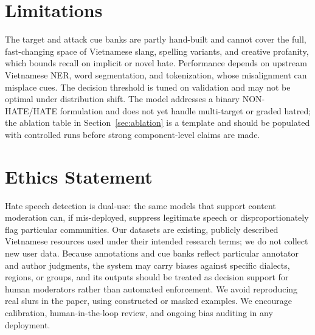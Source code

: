\documentclass[11pt]{article}
\begin{document}
\section*{Limitations}
The target and attack cue banks are partly hand-built and cannot cover the full, fast-changing space of Vietnamese slang, spelling variants, and creative profanity, which bounds recall on implicit or novel hate. Performance depends on upstream Vietnamese NER, word segmentation, and tokenization, whose misalignment can misplace cues. The decision threshold is tuned on validation and may not be optimal under distribution shift. The model addresses a binary NON-HATE/HATE formulation and does not yet handle multi-target or graded hatred; the ablation table in Section~\ref{sec:ablation} is a template and should be populated with controlled runs before strong component-level claims are made.

\section*{Ethics Statement}
Hate speech detection is dual-use: the same models that support content moderation can, if mis-deployed, suppress legitimate speech or disproportionately flag particular communities. Our datasets are existing, publicly described Vietnamese resources used under their intended research terms; we do not collect new user data. Because annotations and cue banks reflect particular annotator and author judgments, the system may carry biases against specific dialects, regions, or groups, and its outputs should be treated as decision support for human moderators rather than automated enforcement. We avoid reproducing real slurs in the paper, using constructed or masked examples. We encourage calibration, human-in-the-loop review, and ongoing bias auditing in any deployment.




\appendix
\end{document}
